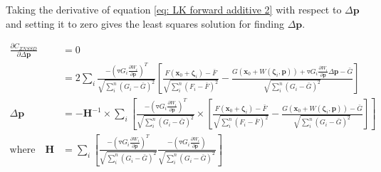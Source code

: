 \documentclass[12pt,oneside,openany,a4paper, %
english, %
masters-t, goldenblock]{usthesis}
\newcommand*\mean[1]{\bar{#1}} %
\begin{document}

Taking the derivative of equation \ref{eq: LK forward additive 2} with respect to $\Delta \bm{p}$ and setting it to zero gives the least squares solution for finding $\Delta \bm{p}$.

\begin{align}
  \frac{\partial C_{ZNSSD}}{\partial \Delta \bm{p}} &= 0 \nonumber \\
  &= 2 \sum_{i} \frac{- \left( \triangledown G_i \frac{\partial W_i}{\partial \bm{p}} \right)^T}{\sqrt{\sum_i^n (G_i-\mean{G})^2}} \left[ \frac{F(\bm{x}_0+\bm{\zeta}_i)-\mean{F}}{\sqrt{\sum_i^n (F_i-\mean{F})^2}} -\frac{G(\bm{x}_0+W(\bm{\zeta}_i,\bm{p}))+\triangledown G_i \frac{\partial W_i}{\partial \bm{p}} \Delta\bm{p}-\mean{G}}{\sqrt{\sum_i^n (G_i-\mean{G})^2}}\right] \\
  \Delta \bm{p} &= - \bm{H}^{-1} \times \sum_{i} \left[ \frac{- \left( \triangledown G_i \frac{\partial W_i}{\partial \bm{p}} \right)^T}{\sqrt{\sum_i^n (G_i-\mean{G})^2}} \times \left[ \frac{ F(\bm{x}_0 + \bm{\zeta}_i) - \mean{F}}{\sqrt{\sum_i^n (F_i-\mean{F})^2}}  -  \frac{G(\bm{x}_0+W(\bm{\zeta}_i, \bm{p}))-\mean{G}}{\sqrt{\sum_i^n (G_i-\mean{G})^2}} \right] \right]
  \label{eq:delta p for ad} \\
  \text{where} \quad \bm{H} &= \sum_{i} \left[ \frac{- (\triangledown G_i \frac{\partial W_i}{\partial \bm{p}})^T}{\sqrt{\sum_i^n (G_i-\mean{G})^2}} \frac{- (\triangledown G_i \frac{\partial W_i}{\partial \bm{p}})}{\sqrt{\sum_i^n (G_i-\mean{G})^2}} \right] \label{eq: LK Hessian for ad}
\end{align}
\end{document}
